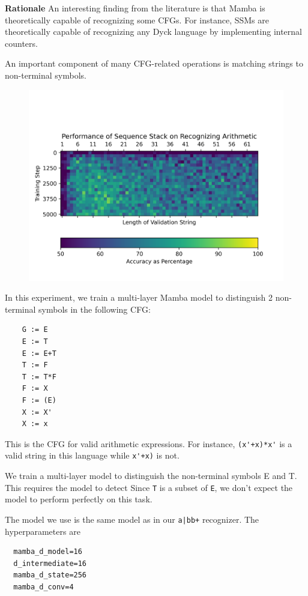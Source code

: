 \textbf{Rationale} An interesting finding from the literature is that Mamba is
theoretically capable of recognizing some CFGs. For instance, SSMs are
theoretically capable of recognizing any Dyck language by implementing internal
counters.

An important component of many CFG-related operations is matching strings to
non-terminal symbols.


\begin{figure}
    \includegraphics[width=\textwidth]{figures/arithmetic.png}
    \caption{}
    \label{resultsarithmetic}
\end{figure}
In this experiment, we train a multi-layer Mamba model to distinguish 2
non-terminal symbols in the following CFG:
\begin{verbatim}
    G := E
    E := T
    E := E+T
    T := F
    T := T*F
    F := X
    F := (E)
    X := X'
    X := x
\end{verbatim}
This is the CFG for valid arithmetic expressions.
For instance, \verb|(x'+x)*x'| is a valid string in this language while
\verb|x'+x)| is not.

We train a multi-layer model to distinguish the non-terminal symbols E and T.
This requires the model to detect 
Since \verb|T| is a subset of \verb|E|, we don't expect the model to perform
perfectly on this task.

The model we use is the same model as in our \texttt{a|bb+} recognizer.
The hyperparameters are \begin{verbatim}
  mamba_d_model=16
  d_intermediate=16
  mamba_d_state=256
  mamba_d_conv=4
\end{verbatim}

